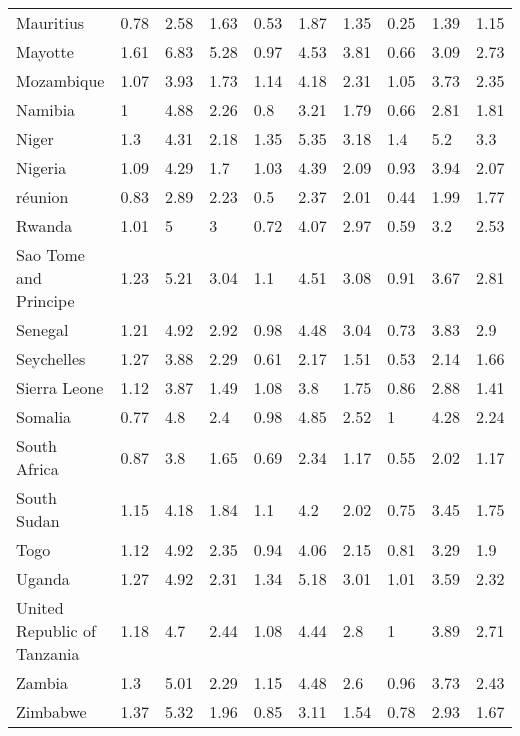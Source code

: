 \begin{longtable}[t]{llllllllll}
Mauritius & 0.78 & 2.58 & 1.63 & 0.53 & 1.87 & 1.35 & 0.25 & 1.39 & 1.15\\
Mayotte & 1.61 & 6.83 & 5.28 & 0.97 & 4.53 & 3.81 & 0.66 & 3.09 & 2.73\\
Mozambique & 1.07 & 3.93 & 1.73 & 1.14 & 4.18 & 2.31 & 1.05 & 3.73 & 2.35\\
Namibia & 1 & 4.88 & 2.26 & 0.8 & 3.21 & 1.79 & 0.66 & 2.81 & 1.81\\
Niger & 1.3 & 4.31 & 2.18 & 1.35 & 5.35 & 3.18 & 1.4 & 5.2 & 3.3\\
Nigeria & 1.09 & 4.29 & 1.7 & 1.03 & 4.39 & 2.09 & 0.93 & 3.94 & 2.07\\
réunion & 0.83 & 2.89 & 2.23 & 0.5 & 2.37 & 2.01 & 0.44 & 1.99 & 1.77\\
Rwanda & 1.01 & 5 & 3 & 0.72 & 4.07 & 2.97 & 0.59 & 3.2 & 2.53\\
Sao Tome and Principe & 1.23 & 5.21 & 3.04 & 1.1 & 4.51 & 3.08 & 0.91 & 3.67 & 2.81\\
Senegal & 1.21 & 4.92 & 2.92 & 0.98 & 4.48 & 3.04 & 0.73 & 3.83 & 2.9\\
Seychelles & 1.27 & 3.88 & 2.29 & 0.61 & 2.17 & 1.51 & 0.53 & 2.14 & 1.66\\
Sierra Leone & 1.12 & 3.87 & 1.49 & 1.08 & 3.8 & 1.75 & 0.86 & 2.88 & 1.41\\
Somalia & 0.77 & 4.8 & 2.4 & 0.98 & 4.85 & 2.52 & 1 & 4.28 & 2.24\\
South Africa & 0.87 & 3.8 & 1.65 & 0.69 & 2.34 & 1.17 & 0.55 & 2.02 & 1.17\\
South Sudan & 1.15 & 4.18 & 1.84 & 1.1 & 4.2 & 2.02 & 0.75 & 3.45 & 1.75\\
Togo & 1.12 & 4.92 & 2.35 & 0.94 & 4.06 & 2.15 & 0.81 & 3.29 & 1.9\\
Uganda & 1.27 & 4.92 & 2.31 & 1.34 & 5.18 & 3.01 & 1.01 & 3.59 & 2.32\\
United Republic of Tanzania & 1.18 & 4.7 & 2.44 & 1.08 & 4.44 & 2.8 & 1 & 3.89 & 2.71\\
Zambia & 1.3 & 5.01 & 2.29 & 1.15 & 4.48 & 2.6 & 0.96 & 3.73 & 2.43\\
Zimbabwe & 1.37 & 5.32 & 1.96 & 0.85 & 3.11 & 1.54 & 0.78 & 2.93 & 1.67\\*
\end{longtable}
\endgroup{}
